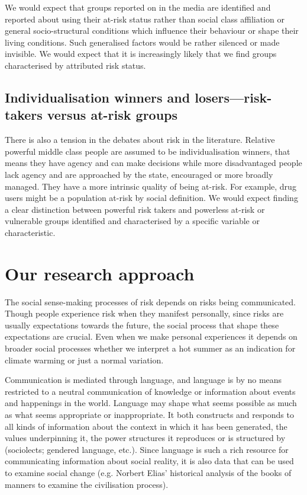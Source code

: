 \documentclass{report}
\begin{document}
We would expect that groups reported on in the media are identified and reported about using their at-risk status rather than social class affiliation or general socio-structural conditions which influence their behaviour or shape their living conditions. Such generalised factors would be rather silenced or made invisible. We would expect that it is increasingly likely that we find groups characterised by attributed risk status.

\subsection*{Individualisation winners and losers---risk-takers versus at-risk groups}

There is also a tension in the debates about risk in the literature. Relative powerful middle class people are assumed to be individualisation winners, that means they have agency and can make decisions while more disadvantaged people lack agency and are approached by the state, encouraged or more broadly managed. They have a more intrinsic quality of being at-risk. For example, drug users might be a population at-risk by social definition. We would expect finding a clear distinction between powerful risk takers and powerless at-risk or vulnerable groups identified and characterised by a specific variable or characteristic.


\section{Our research approach}

The social sense-making processes of risk depends on risks being communicated. Though people experience risk when they manifest personally, since risks are usually expectations towards the future, the social process that shape these expectations are crucial. Even when we make personal experiences it depends on broader social processes whether we interpret a hot summer as an indication for climate warming or just a normal variation.

Communication is mediated through language, and language is by no means restricted to a neutral communication of knowledge or information about events and happenings in the world. Language may shape what seems possible as much as what seems appropriate or inappropriate. It both constructs and responds to all kinds of information about the context in which it has been generated, the values underpinning it, the power structures it reproduces or is structured by (sociolects; gendered language, etc.). Since language is such a rich resource for communicating information about social reality, it is also data that can be used to examine social change (e.g. Norbert Elias' historical analysis of the books of manners to examine the civilisation process). 
\end{document}
